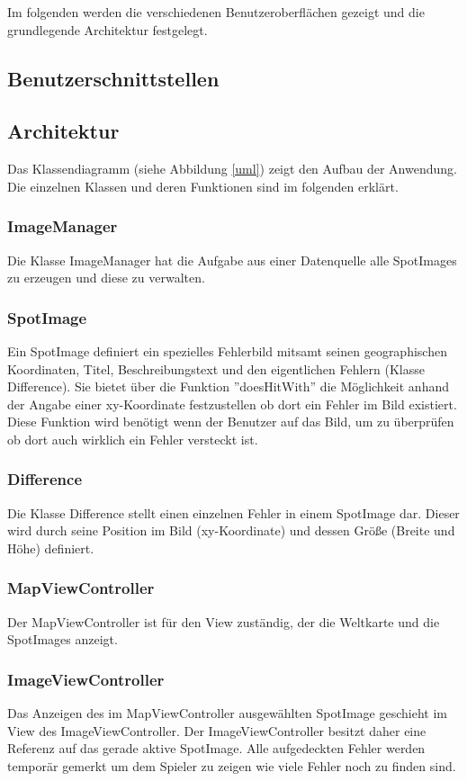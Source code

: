Im folgenden werden die verschiedenen Benutzeroberflächen gezeigt und die grundlegende Architektur festgelegt.

\subsection{Benutzerschnittstellen}


\subsection{Architektur}
Das Klassendiagramm (siehe Abbildung \ref{uml}) zeigt den Aufbau der Anwendung. Die einzelnen Klassen und deren Funktionen sind im folgenden erklärt.

\subsubsection*{ImageManager}
Die Klasse ImageManager hat die Aufgabe aus einer Datenquelle alle SpotImages zu erzeugen und diese zu verwalten.

\subsubsection*{SpotImage}
Ein SpotImage definiert ein spezielles Fehlerbild mitsamt seinen geographischen Koordinaten, Titel, Beschreibungstext und den eigentlichen Fehlern (Klasse Difference). Sie bietet über die Funktion ''doesHitWith'' die Möglichkeit anhand der Angabe einer xy-Koordinate festzustellen ob dort ein Fehler im Bild existiert. Diese Funktion wird benötigt wenn der Benutzer auf das Bild, um zu überprüfen ob dort auch wirklich ein Fehler versteckt ist.

\subsubsection*{Difference}
Die Klasse Difference stellt einen einzelnen Fehler in einem SpotImage dar. Dieser wird durch seine Position im Bild (xy-Koordinate) und dessen Größe (Breite und Höhe) definiert.

\subsubsection*{MapViewController}
Der MapViewController ist für den View zuständig, der die Weltkarte und die SpotImages anzeigt.

\subsubsection*{ImageViewController}
Das Anzeigen des im MapViewController ausgewählten SpotImage geschieht im View des ImageViewController. Der ImageViewController besitzt daher eine Referenz auf das gerade aktive SpotImage. Alle aufgedeckten Fehler werden temporär gemerkt um dem Spieler zu zeigen wie viele Fehler noch zu finden sind.

